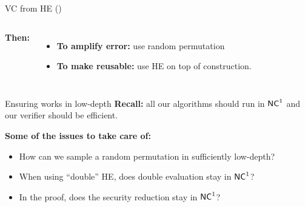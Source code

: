 \begin{frame}[t]{VC from HE (\cite{ckv10})}
\begin{columns}
	\textbf{Then:}
	\pause
	\begin{itemize}
		\item \textbf{To amplify error:} use random permutation\pause
		\item \textbf{To make reusable:} use HE  on top of construction.
	\end{itemize}
	
	\end{columns}
\end{frame}


\begin{frame}{Ensuring \cite{ckv10} works in low-depth}
	\textbf{Recall:} all our algorithms should run in ${\mathsf{NC}}^1$ and our verifier should be efficient.\pause
	
	\textbf{Some of the issues to take care of: }
	\begin{itemize}[<+- | alert@+>]
		\item How can we sample a random permutation in sufficiently low-depth?
		\item When using ``double'' HE, does double evaluation stay in ${\mathsf{NC}}^1$?
		\item In the proof, does the security reduction stay in ${\mathsf{NC}}^1$?
	\end{itemize}
\end{frame}

